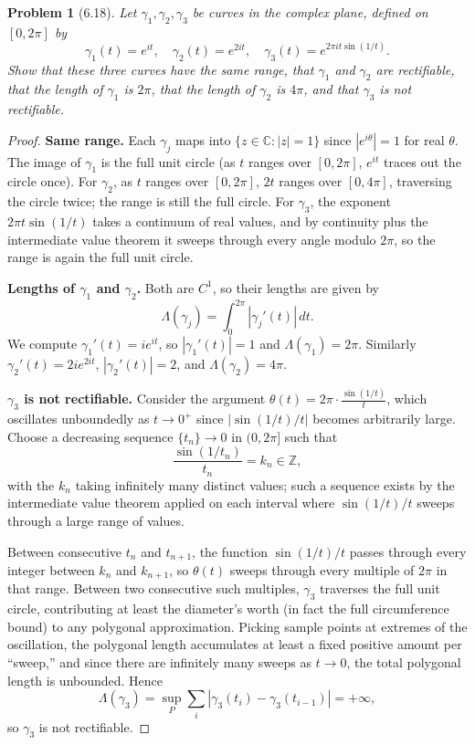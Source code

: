 \documentclass[12 pt]{article}
\newtheorem{prob}{Problem}
\begin{document}
\begin{prob}[6.18]
Let $\gamma_{1}, \gamma_{2}, \gamma_{3}$ be curves in the complex plane, defined on $[0,2\pi]$ by
$$
\gamma_{1}(t)=e^{it}, \quad \gamma_{2}(t)=e^{2it}, \quad \gamma_{3}(t)=e^{2\pi i t \sin(1/t)}.
$$
Show that these three curves have the same range, that $\gamma_{1}$ and $\gamma_{2}$ are rectifiable, that the length of $\gamma_{1}$ is $2\pi$, that the length of $\gamma_{2}$ is $4\pi$, and that $\gamma_{3}$ is not rectifiable.
\end{prob}
\begin{proof}
\textbf{Same range.} Each $\gamma_j$ maps into $\{z \in \mathbb{C} : |z| = 1\}$ since $|e^{i\theta}| = 1$ for real $\theta$. The image of $\gamma_1$ is the full unit circle (as $t$ ranges over $[0, 2\pi]$, $e^{it}$ traces out the circle once). For $\gamma_2$, as $t$ ranges over $[0, 2\pi]$, $2t$ ranges over $[0, 4\pi]$, traversing the circle twice; the range is still the full circle. For $\gamma_3$, the exponent $2\pi t \sin(1/t)$ takes a continuum of real values, and by continuity plus the intermediate value theorem it sweeps through every angle modulo $2\pi$, so the range is again the full unit circle.

\textbf{Lengths of $\gamma_1$ and $\gamma_2$.} Both are $C^1$, so their lengths are given by
$$
\Lambda(\gamma_j) = \int_0^{2\pi} |\gamma_j'(t)|\, dt.
$$
We compute $\gamma_1'(t) = i e^{it}$, so $|\gamma_1'(t)| = 1$ and $\Lambda(\gamma_1) = 2\pi$. Similarly $\gamma_2'(t) = 2i e^{2it}$, $|\gamma_2'(t)| = 2$, and $\Lambda(\gamma_2) = 4\pi$.

\textbf{$\gamma_3$ is not rectifiable.} Consider the argument $\theta(t) = 2\pi\cdot \frac{\sin(1/t)}{t}$, which oscillates unboundedly as $t \to 0^+$ since $|\sin(1/t)/t|$ becomes arbitrarily large. Choose a decreasing sequence $\{t_n\} \to 0$ in $(0, 2\pi]$ such that
$$
\frac{\sin(1/t_n)}{t_n} = k_n \in \mathbb{Z},
$$
with the $k_n$ taking infinitely many distinct values; such a sequence exists by the intermediate value theorem applied on each interval where $\sin(1/t)/t$ sweeps through a large range of values.

Between consecutive $t_n$ and $t_{n+1}$, the function $\sin(1/t)/t$ passes through every integer between $k_n$ and $k_{n+1}$, so $\theta(t)$ sweeps through every multiple of $2\pi$ in that range. Between two consecutive such multiples, $\gamma_3$ traverses the full unit circle, contributing at least the diameter's worth (in fact the full circumference bound) to any polygonal approximation. Picking sample points at extremes of the oscillation, the polygonal length accumulates at least a fixed positive amount per ``sweep,'' and since there are infinitely many sweeps as $t \to 0$, the total polygonal length is unbounded. Hence
$$
\Lambda(\gamma_3) = \sup_P \sum_i |\gamma_3(t_i) - \gamma_3(t_{i-1})| = +\infty,
$$
so $\gamma_3$ is not rectifiable.
\end{proof}
\end{document}
